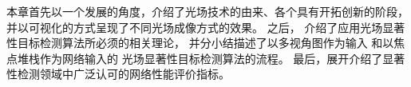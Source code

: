 










本章首先以一个发展的角度，介绍了光场技术的由来、各个具有开拓创新的阶段，
并以可视化的方式呈现了不同光场成像方式的效果。
之后，
介绍了应用光场显著性目标检测算法所必须的相关理论，
并分小结描述了以多视角图作为输入
和以焦点堆栈作为网络输入的
光场显著性目标检测算法的流程。
最后，展开介绍了显著性检测领域中广泛认可的网络性能评价指标。








































